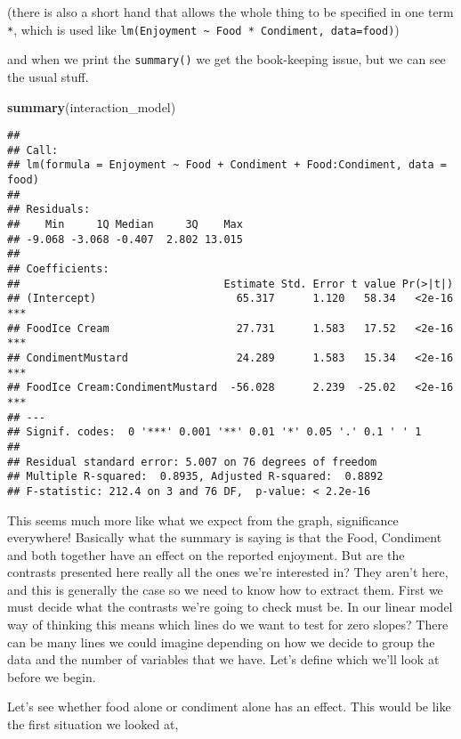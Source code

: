 \documentclass[]{book}
\newenvironment{Shaded}{\begin{snugshade}}{\end{snugshade}}
\newcommand{\KeywordTok}[1]{\textcolor[rgb]{0.13,0.29,0.53}{\textbf{#1}}}
\newcommand{\NormalTok}[1]{#1}
\begin{document}
(there is also a short hand that allows the whole thing to be specified in one term \texttt{*}, which is used like \texttt{lm(Enjoyment\ \textasciitilde{}\ Food\ *\ Condiment,\ data=food)})

and when we print the \texttt{summary()} we get the book-keeping issue, but we can see the usual stuff.

\begin{Shaded}
\begin{Highlighting}[]
\KeywordTok{summary}\NormalTok{(interaction_model)}
\end{Highlighting}
\end{Shaded}

\begin{verbatim}
## 
## Call:
## lm(formula = Enjoyment ~ Food + Condiment + Food:Condiment, data = food)
## 
## Residuals:
##    Min     1Q Median     3Q    Max 
## -9.068 -3.068 -0.407  2.802 13.015 
## 
## Coefficients:
##                                Estimate Std. Error t value Pr(>|t|)    
## (Intercept)                      65.317      1.120   58.34   <2e-16 ***
## FoodIce Cream                    27.731      1.583   17.52   <2e-16 ***
## CondimentMustard                 24.289      1.583   15.34   <2e-16 ***
## FoodIce Cream:CondimentMustard  -56.028      2.239  -25.02   <2e-16 ***
## ---
## Signif. codes:  0 '***' 0.001 '**' 0.01 '*' 0.05 '.' 0.1 ' ' 1
## 
## Residual standard error: 5.007 on 76 degrees of freedom
## Multiple R-squared:  0.8935, Adjusted R-squared:  0.8892 
## F-statistic: 212.4 on 3 and 76 DF,  p-value: < 2.2e-16
\end{verbatim}

This seems much more like what we expect from the graph, significance everywhere! Basically what the summary is saying is that the Food, Condiment and both together have an effect on the reported enjoyment. But are the contrasts presented here really all the ones we're interested in? They aren't here, and this is generally the case so we need to know how to extract them. First we must decide what the contrasts we're going to check must be. In our linear model way of thinking this means which lines do we want to test for zero slopes? There can be many lines we could imagine depending on how we decide to group the data and the number of variables that we have. Let's define which we'll look at before we begin.

Let's see whether food alone or condiment alone has an effect. This would be like the first situation we looked at,
\end{document}
